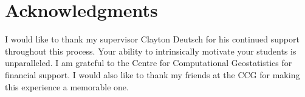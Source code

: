 
\chapter*{Acknowledgments}

I would like to thank my supervisor Clayton Deutsch for his continued support throughout this process. Your ability to intrinsically motivate your students is unparalleled. I am grateful to the Centre for Computational Geostatistics for financial support. I would also like to thank my friends at the CCG for making this experience a memorable one.